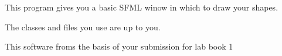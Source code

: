 This program gives you a basic S\+F\+ML winow in which to draw your shapes.

The classes and files you use are up to you. ~\newline


This software froms the basis of your submission for lab book 1 